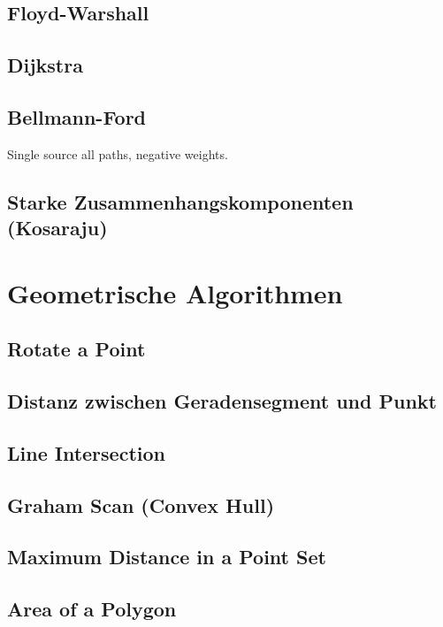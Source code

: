 \documentclass[10pt,a4paper,ngerman]{article}
\begin{document}
\begin{multicols}{2}
\subsection{Floyd-Warshall}

\subsection{Dijkstra}

\subsection{Bellmann-Ford}
Single source all paths, negative weights.

\subsection{Starke Zusammenhangskomponenten (Kosaraju)}


\section{Geometrische Algorithmen}
\subsection{Rotate a Point}

\subsection{Distanz zwischen Geradensegment und Punkt}

\subsection{Line Intersection}

\subsection{Graham Scan (Convex Hull)}

\subsection{Maximum Distance in a Point Set}

\subsection{Area of a Polygon}


\end{multicols}
\end{document}
